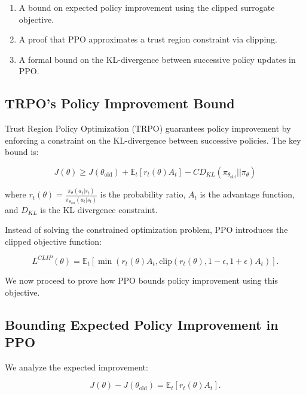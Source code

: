 \documentclass[12pt]{extreport} %
\begin{document}
\begin{enumerate}
    \item A bound on expected policy improvement using the clipped surrogate objective.
    \item A proof that PPO approximates a trust region constraint via clipping.
    \item A formal bound on the KL-divergence between successive policy updates in PPO.
\end{enumerate}

\subsection{TRPO's Policy Improvement Bound}

Trust Region Policy Optimization (TRPO) guarantees policy improvement by enforcing a constraint on the KL-divergence between successive policies. The key bound is:

\begin{equation}
J(\theta) \geq J(\theta_{\text{old}}) + \mathbb{E}_t \left[ r_t(\theta) A_t \right] - C D_{KL} (\pi_{\theta_{\text{old}}} || \pi_{\theta} )
\end{equation}

where $r_t(\theta) = \frac{\pi_{\theta}(a_t | s_t)}{\pi_{\theta_{\text{old}}}(a_t | s_t)}$ is the probability ratio, $A_t$ is the advantage function, and $D_{KL}$ is the KL divergence constraint.

Instead of solving the constrained optimization problem, PPO introduces the clipped objective function:

\begin{equation}
L^{CLIP}(\theta) = \mathbb{E}_t \left[ \min(r_t(\theta) A_t, \text{clip}(r_t(\theta), 1-\epsilon, 1+\epsilon) A_t ) \right].
\end{equation}

We now proceed to prove how PPO bounds policy improvement using this objective.

\subsection{Bounding Expected Policy Improvement in PPO}

We analyze the expected improvement:

\begin{equation}
J(\theta) - J(\theta_{\text{old}}) = \mathbb{E}_t \left[ r_t(\theta) A_t \right].
\end{equation}
\end{document}
